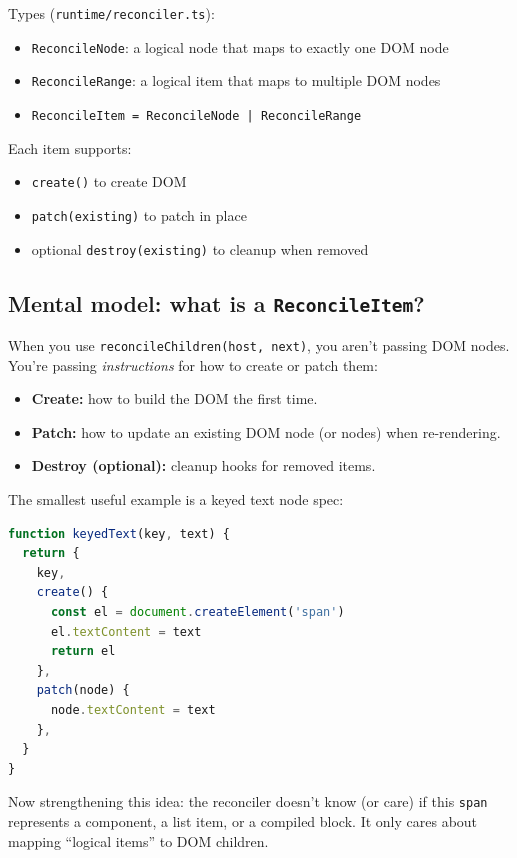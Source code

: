Types (\texttt{runtime/reconciler.ts}):

\begin{itemize}
  \item \texttt{ReconcileNode}: a logical node that maps to exactly one DOM node
  \item \texttt{ReconcileRange}: a logical item that maps to multiple DOM nodes
  \item \texttt{ReconcileItem = ReconcileNode | ReconcileRange}
\end{itemize}

Each item supports:

\begin{itemize}
  \item \texttt{create()} to create DOM
  \item \texttt{patch(existing)} to patch in place
  \item optional \texttt{destroy(existing)} to cleanup when removed
\end{itemize}

\subsection{Mental model: what is a \texttt{ReconcileItem}?}

When you use \texttt{reconcileChildren(host, next)}, you aren’t passing DOM nodes.
You’re passing \emph{instructions} for how to create or patch them:

\begin{itemize}
  \item \textbf{Create:} how to build the DOM the first time.
  \item \textbf{Patch:} how to update an existing DOM node (or nodes) when re-rendering.
  \item \textbf{Destroy (optional):} cleanup hooks for removed items.
\end{itemize}

The smallest useful example is a keyed text node spec:

\begin{lstlisting}[language=JavaScript]
function keyedText(key, text) {
  return {
    key,
    create() {
      const el = document.createElement('span')
      el.textContent = text
      return el
    },
    patch(node) {
      node.textContent = text
    },
  }
}
\end{lstlisting}

Now strengthening this idea: the reconciler doesn’t know (or care) if this \texttt{span} represents a component, a list item, or a compiled block.
It only cares about mapping “logical items” to DOM children.

